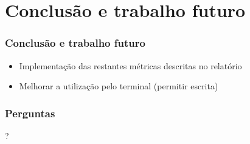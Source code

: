 \documentclass{beamer}
\begin{document}
\section{Conclusão e trabalho futuro}
\begin{frame} \frametitle{Conclusão e trabalho futuro}
\begin{itemize}
\item Implementação das restantes métricas descritas no relatório
\item Melhorar a utilização pelo terminal (permitir escrita)
\end{itemize}
\end{frame}

\begin{frame} \frametitle{Perguntas}
\begin{center}\huge{?}\end{center}
\end{frame}
\end{document}
